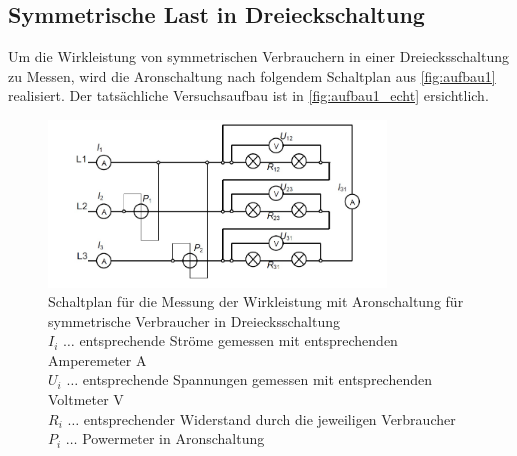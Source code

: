 \documentclass[12pt,english,ngerman]{scrartcl}
\begin{document}
\subsection{Symmetrische Last in Dreieckschaltung}

Um die Wirkleistung von symmetrischen Verbrauchern in einer Dreiecksschaltung zu Messen, wird die Aronschaltung
nach folgendem Schaltplan aus \autoref{fig:aufbau1} realisiert. 
Der tatsächliche Versuchsaufbau ist in \autoref{fig:aufbau1_echt} ersichtlich.

\begin{figure}[H]
	\begin{center}
		\includegraphics[width = 0.8\textwidth]{./figures/aufbau1.png}
	\end{center}
	\caption[Schaltplan für die Messung der Wirkleistung mit Aronschaltung für symmetrische
	Verbraucher in Dreiecksschaltung]
	{Schaltplan für die Messung der Wirkleistung mit Aronschaltung für symmetrische
	Verbraucher in Dreiecksschaltung~\cite[]{leistungsmessungvorbereitung}  \\
	$I_i$ \(\dots\) entsprechende Ströme gemessen mit entsprechenden Amperemeter A  \\
	$U_i$ \(\dots\) entsprechende Spannungen gemessen mit entsprechenden Voltmeter V  \\
	$R_i$ \(\dots\) entsprechender Widerstand durch die jeweiligen Verbraucher  \\
	$P_i$ \(\dots\) Powermeter in Aronschaltung
	}\label{fig:aufbau1}
\end{figure}
\end{document}
